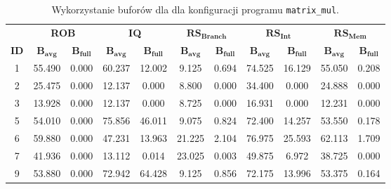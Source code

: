 \begin{table}[]
\centering
\caption{ Wykorzystanie buforów dla dla konfiguracji programu \texttt{matrix\_mul}. }
\label{tab:buffers_matrix_mul}
\begin{tabular}{|c|cc|cc|cc|cc|cc|}
\hline& \multicolumn{2}{c|}{\textbf{ROB}} & \multicolumn{2}{c|}{\textbf{IQ}} & \multicolumn{2}{c|}{$\mathbf{RS_{Branch}}$} & \multicolumn{2}{c|}{$\mathbf{RS_{Int}}$} & \multicolumn{2}{c|}{$\mathbf{RS_{Mem}}$} \\ \cline{2-11}
\multirow{-2}{*}{\cellcolor[HTML]{EFEFEF}\textbf{ID}} & $\mathbf{B_{avg}}$ & \cellcolor[HTML]{EFEFEF}$\mathbf{B_{full}}$ & $\mathbf{B_{avg}}$ & \cellcolor[HTML]{EFEFEF}$\mathbf{B_{full}}$ & $\mathbf{B_{avg}}$ & \cellcolor[HTML]{EFEFEF}$\mathbf{B_{full}}$ & $\mathbf{B_{avg}}$ & \cellcolor[HTML]{EFEFEF}$\mathbf{B_{full}}$ & $\mathbf{B_{avg}}$ & \cellcolor[HTML]{EFEFEF}$\mathbf{B_{full}}$ \\ \hline
1 & 55.490 & \cellcolor[HTML]{EFEFEF}0.000 & 60.237 & \cellcolor[HTML]{EFEFEF}12.002 & 9.125 & \cellcolor[HTML]{EFEFEF}0.694 & 74.525 & \cellcolor[HTML]{EFEFEF}16.129 & 55.050 & \cellcolor[HTML]{EFEFEF}0.208 \\ \hline
2 & 25.475 & \cellcolor[HTML]{EFEFEF}0.000 & 12.137 & \cellcolor[HTML]{EFEFEF}0.000 & 8.800 & \cellcolor[HTML]{EFEFEF}0.000 & 34.400 & \cellcolor[HTML]{EFEFEF}0.000 & 24.888 & \cellcolor[HTML]{EFEFEF}0.000 \\ \hline
3 & 13.928 & \cellcolor[HTML]{EFEFEF}0.000 & 12.137 & \cellcolor[HTML]{EFEFEF}0.000 & 8.725 & \cellcolor[HTML]{EFEFEF}0.000 & 16.931 & \cellcolor[HTML]{EFEFEF}0.000 & 12.231 & \cellcolor[HTML]{EFEFEF}0.000 \\ \hline
5 & 54.010 & \cellcolor[HTML]{EFEFEF}0.000 & 75.856 & \cellcolor[HTML]{EFEFEF}46.011 & 9.075 & \cellcolor[HTML]{EFEFEF}0.824 & 72.400 & \cellcolor[HTML]{EFEFEF}14.257 & 53.550 & \cellcolor[HTML]{EFEFEF}0.178 \\ \hline
6 & 59.880 & \cellcolor[HTML]{EFEFEF}0.000 & 47.231 & \cellcolor[HTML]{EFEFEF}13.963 & 21.225 & \cellcolor[HTML]{EFEFEF}2.104 & 76.975 & \cellcolor[HTML]{EFEFEF}25.593 & 62.113 & \cellcolor[HTML]{EFEFEF}1.709 \\ \hline
7 & 41.936 & \cellcolor[HTML]{EFEFEF}0.000 & 13.112 & \cellcolor[HTML]{EFEFEF}0.014 & 23.025 & \cellcolor[HTML]{EFEFEF}0.003 & 49.875 & \cellcolor[HTML]{EFEFEF}6.972 & 38.725 & \cellcolor[HTML]{EFEFEF}0.000 \\ \hline
9 & 53.880 & \cellcolor[HTML]{EFEFEF}0.000 & 72.942 & \cellcolor[HTML]{EFEFEF}64.428 & 9.125 & \cellcolor[HTML]{EFEFEF}0.856 & 72.175 & \cellcolor[HTML]{EFEFEF}13.996 & 53.375 & \cellcolor[HTML]{EFEFEF}0.164 \\ \hline

\end{tabular}
\end{table}
